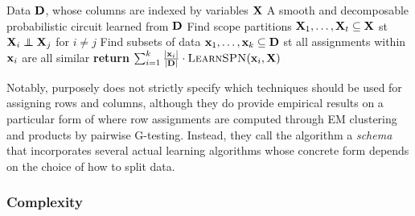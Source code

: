 \begin{algorithm}[t]
  \caption{}\label{alg:learnspn}
  \begin{algorithmic}[1]
    \Require Data $\mathbf{D}$, whose columns are indexed by variables $\mathbf{X}$
    \Ensure A smooth and decomposable probabilistic circuit learned from $\mathbf{D}$
    \NIElse
      \State Find scope partitions $\mathbf{X}_1,\ldots,\mathbf{X}_t\subseteq\mathbf{X}$ st
        $\set{X}_i\indep\set{X}_j$ for $i\neq j$
      \NIElse
        \State Find subsets of data $\mathbf{x}_1,\ldots,\mathbf{x}_k\subseteq\mathbf{D}$ st all assignments
          within $\mathbf{x}_i$ are all similar
        \State \textbf{return} $\sum_{i=1}^k \frac{|\set{x}_i|}{|\set{D}|}\cdot
          \textproc{LearnSPN}(\set{x}_i,\set{X})$
      \EndNIElse
    \EndNIElse
  \end{algorithmic}
\end{algorithm}

Notably, \citep{gens13} purposely does not strictly specify which techniques should be used for
assigning rows and columns, although they do provide empirical results on a particular form of
 where row assignments are computed through EM clustering and products by
pairwise G-testing. Instead, they call the algorithm a \emph{schema} that incorporates several
actual learning algorithms whose concrete form depends on the choice of how to split data.

\subsubsection{Complexity}

